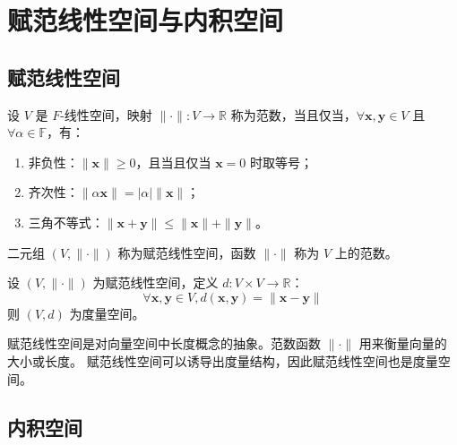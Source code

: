 \section{赋范线性空间与内积空间}

\subsection{赋范线性空间}

\begin{definition}
    设 $ V $ 是 $F$-线性空间，映射 $ \|\cdot\|:V\to \mathbb{R} $ 称为范数，当且仅当，$ \forall \mathbf{x},\mathbf{y}\in V $ 且 $ \forall \alpha\in \mathbb{F} $，有：
    \begin{enumerate}
        \item 非负性：$ \|\mathbf{x}\|\geq 0 $，且当且仅当 $ \mathbf{x}=0 $ 时取等号；
        \item 齐次性：$ \|\alpha \mathbf{x}\|=|\alpha|\|\mathbf{x}\| $；
        \item 三角不等式：$ \|\mathbf{x}+\mathbf{y}\| \leq \|\mathbf{x}\|+\|\mathbf{y}\| $。
    \end{enumerate}
    二元组 $ (V,\|\cdot\|) $ 称为赋范线性空间，函数 $ \|\cdot\| $ 称为 $ V $ 上的范数。
    \label{def:normed_linear_space}
\end{definition}

\begin{proposition}[赋范线性空间诱导的度量]
    设 $ (V,\|\cdot\|) $ 为赋范线性空间，定义 $ d:V\times V\to \mathbb{R} $：
    \[
        \forall \mathbf{x},\mathbf{y}\in V, d(\mathbf{x},\mathbf{y})=\|\mathbf{x}-\mathbf{y}\| 
    \]
    则 $ (V,d) $ 为度量空间。
\end{proposition}

\begin{note}
    赋范线性空间是对向量空间中长度概念的抽象。范数函数 $ \|\cdot\| $ 用来衡量向量的大小或长度。
    赋范线性空间可以诱导出度量结构，因此赋范线性空间也是度量空间。
\end{note}

\vspace{1em}
\subsection{内积空间}

